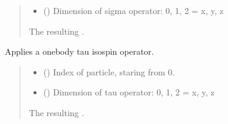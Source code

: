 \documentclass[letterpaper,10pt,english]{sphinxmanual}
\begin{document}
\begin{fulllineitems}
\begin{fulllineitems}
\begin{quote}
\begin{description}
\begin{itemize}
\item {} 
\sphinxAtStartPar
{} () \textendash{} Dimension of sigma operator: 0, 1, 2 = x, y, z

\end{itemize}

\sphinxAtStartPar
The resulting .

\sphinxAtStartPar
{\hyperref[\detokenize{spinbox:spinbox.core.ProductOperator}]{}}

\end{description}\end{quote}

\end{fulllineitems}


\begin{fulllineitems}
\label{\detokenize{spinbox:spinbox.core.ProductOperator.apply_tau}}
\pysigstartsignatures
{}
\pysigstopsignatures
\sphinxAtStartPar
Applies a one\sphinxhyphen{}body tau isospin operator.
\begin{quote}\begin{description}
\begin{itemize}
\item {} 
\sphinxAtStartPar
{} () \textendash{} Index of particle, staring from 0.

\item {} 
\sphinxAtStartPar
{} () \textendash{} Dimension of tau operator: 0, 1, 2 = x, y, z

\end{itemize}

\sphinxAtStartPar
The resulting .


\end{description}
\end{quote}
\end{fulllineitems}
\end{fulllineitems}
\end{document}
